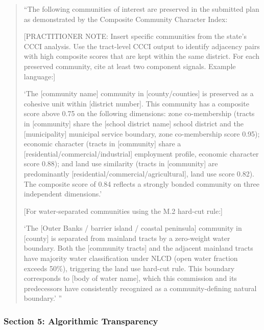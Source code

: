 \begin{quote}
``The following communities of interest are preserved in the submitted plan
as demonstrated by the Composite Community Character Index:

[PRACTITIONER NOTE: Insert specific communities from the state's CCCI analysis.
Use the tract-level CCCI output to identify adjacency pairs with high composite
scores that are kept within the same district. For each preserved community,
cite at least two component signals. Example language:]

`The [community name] community in [county/counties] is preserved as a cohesive
unit within [district number].
This community has a composite score above 0.75 on the following dimensions:
zone co-membership (tracts in [community] share the [school district name]
school district and the [municipality] municipal service boundary, zone
co-membership score 0.95); economic character (tracts in [community] share
a [residential/commercial/industrial] employment profile, economic character
score 0.88); and land use similarity (tracts in [community] are predominantly
[residential/commercial/agricultural], land use score 0.82).
The composite score of 0.84 reflects a strongly bonded community on three
independent dimensions.'

[For water-separated communities using the M.2 hard-cut rule:]

`The [Outer Banks / barrier island / coastal peninsula] community in [county]
is separated from mainland tracts by a zero-weight water boundary.
Both the [community tracts] and the adjacent mainland tracts have majority
water classification under NLCD (open water fraction exceeds 50\%), triggering
the land use hard-cut rule.
This boundary corresponds to [body of water name], which this commission and
its predecessors have consistently recognized as a community-defining natural
boundary.'
''
\end{quote}

\subsubsection*{Section 5: Algorithmic Transparency}

